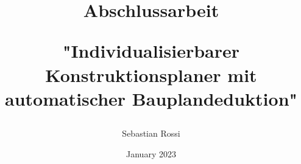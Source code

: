 \documentclass[]{MSword}
\title{Abschlussarbeit 

"Individualisierbarer Konstruktionsplaner mit automatischer Bauplandeduktion"}
\author{Sebastian Rossi}
\date{January 2023}
\begin{document}
\maketitle








\medskip

\printbibliography
\end{document}
